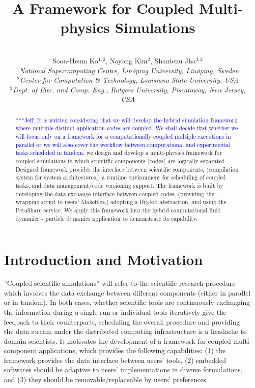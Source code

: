 \documentclass[10pt,conference]{IEEEtran}
\title{A Framework for Coupled Multi-physics Simulations \skonote{some charming title?? 
emphasizing ''it can cover various kinds of applications in different requirement, 
main components can be replaced by other similar softwares, etc.''} }
\author{
 ~\\[-2em]
 Soon-Heum Ko$^{1,2}$, Nayong Kim$^{2}$, Shantenu Jha$^{3,2}$\\
 \small{\emph{$^{1}$National Supercomputing Centre, Lin\"{o}ping University, Lin\"{o}ping, Sweden}}\\
 \small{\emph{$^{2}$Center for Computation \& Technology, Louisiana State University, USA}}\\
 \small{\emph{$^{3}$Dept. of Elec. and Comp. Eng., Rutgers University, Piscataway, New Jersey, USA}}\\
}
\newcommand{\skonote}[1]{ {\textcolor{blue} { ***Jeff: #1 }}}
\newcommand{\skonote}[1]{}
\newcommand{\up}{\vspace*{-1em}}
\begin{document}
\maketitle

\begin{abstract}
\skonote{It is written considering that we will develop the hybrid simulation framework where multiple distinct application codes are coupled. We shall decide first whether we will focus only on a framework for a computationally coupled multiple executions in parallel or we will also cover the workflow between computational and experimental tasks scheduled in tandem.}
we design and develop a multi-physics framework for coupled simulations
in which scientific components (codes) are logically separated.
Designed framework provides the interface between scientific components,
(compilation system for system architectures,)
a runtime environment for scheduling of coupled tasks, and
data management/code versioning support.
The framework is built by developing the data exchange interface 
between coupled codes, (providing the wrapping script to users' Makefiles,)
adopting a BigJob abstraction, and using the PetaShare service.
We apply this framework into the hybrid computational fluid dynamics -
particle dynamics application to demonstrate its capability.
\end{abstract}
\up\up

\section{Introduction and Motivation}

''Coupled scientific simulations'' will refer to the scientific 
research procedure which involves the data exchange between
different components (either in parallel or in tandem). In both cases,
whether scientific tools are continuously exchanging the information 
during a single run or individual tools iteratively give the feedback
to their counterparts, scheduling the overall procedure and
providing the data stream under the distributed computing infrastructure
is a headache to domain scientists. It motivates the development of
a framework for coupled multi-component applications,
which provides the following capabilities:
(1) the framework provides the data interface between users' tools,
(2) embedded softwares should be adaptive to users' implementations 
in diverse formulations, and 
(3) they should be removable/replaceable by users' preferences.
\end{document}
